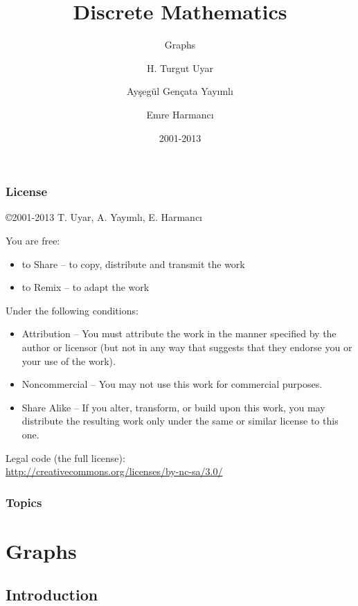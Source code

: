 \documentclass[dvipsnames]{beamer}
\title{Discrete Mathematics}
\subtitle{Graphs}
\author{H. Turgut Uyar \and Ayşegül Gençata Yayımlı \and Emre Harmancı}
\date{2001-2013}
\begin{document}
\begin{frame}
  \titlepage
\end{frame}

\begin{frame}
  \frametitle{License}

  \hfill
  \copyright 2001-2013 T. Uyar, A. Yayımlı, E. Harmancı

  \vfill
  \begin{tiny}
    You are free:
    \begin{itemize}
      \item to Share -- to copy, distribute and transmit the work
      \item to Remix -- to adapt the work
    \end{itemize}

    Under the following conditions:
    \begin{itemize}
      \item Attribution -- You must attribute the work in the manner specified by
        the author or licensor (but not in any way that suggests that they
        endorse you or your use of the work).

      \item Noncommercial -- You may not use this work for commercial purposes.

      \item Share Alike -- If you alter, transform, or build upon this work, you
        may distribute the resulting work only under the same or similar license
        to this one.
    \end{itemize}
  \end{tiny}

  \vfill
  Legal code (the full license):\\
  \url{http://creativecommons.org/licenses/by-nc-sa/3.0/}
\end{frame}

\begin{frame}
  \frametitle{Topics}
  \tableofcontents
\end{frame}

\section{Graphs}

\subsection{Introduction}
\end{document}
